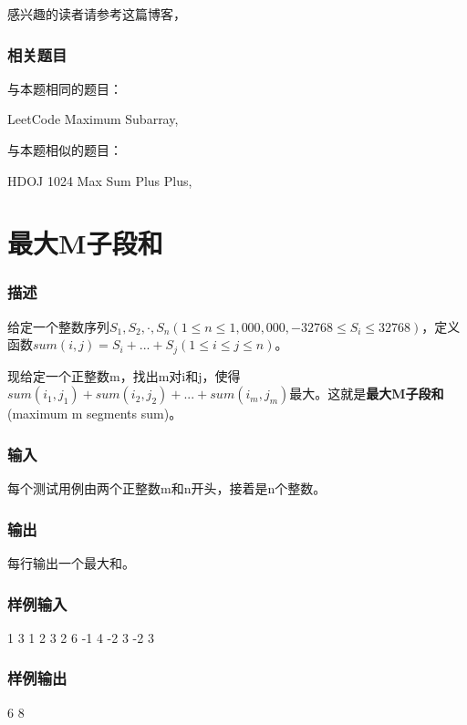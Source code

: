 感兴趣的读者请参考这篇博客，

\subsubsection{相关题目}
与本题相同的题目：
\begindot
\item LeetCode Maximum Subarray, 
\myenddot

与本题相似的题目：
\begindot
\item HDOJ 1024 Max Sum Plus Plus, 
\myenddot


\section{最大M子段和} %
\label{sec:mmss}

\subsubsection{描述}
给定一个整数序列$S_1,S_2,\cdot,S_n(1 \leq n \leq 1,000,000, -32768 \leq S_i \leq 32768)$，定义函数$sum(i,j)=S_i+ ... +S_j(1 \leq i \leq j \leq n)$。

现给定一个正整数m，找出m对i和j，使得$sum(i_1,j_1)+sum(i_2,j_2)+ ... +sum(i_m,j_m)$最大。这就是\textbf{最大M子段和}(maximum m segments sum)。

\subsubsection{输入}
每个测试用例由两个正整数m和n开头，接着是n个整数。

\subsubsection{输出}
每行输出一个最大和。

\subsubsection{样例输入}
\begin{Code}
1 3 1 2 3
2 6 -1 4 -2 3 -2 3
\end{Code}

\subsubsection{样例输出}
\begin{Code}
6
8
\end{Code}

